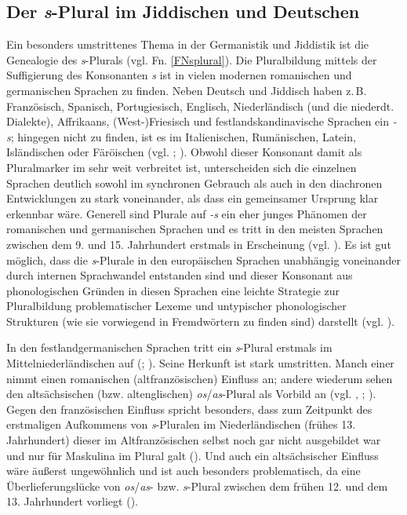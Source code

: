  \subsection{Der \textit{s}-Plural im Jiddischen und Deutschen}\label{sPlural}
 Ein besonders umstrittenes Thema in der Germanistik und Jiddistik ist die Genealogie des \textit{s}-Plurals (vgl. Fn. \ref{FNsplural}). Die Pluralbildung mittels der Suffigierung des Konsonanten \textit{s} ist in vielen modernen romanischen und germanischen Sprachen zu finden. Neben Deutsch und Jiddisch haben z.\,B. Französisch, Spanisch, Portugiesisch, Englisch, Niederländisch (und die niederdt. Dialekte), Affrikaans, (West-)Friesisch und  festlandskandinavische Sprachen ein  \textit{-s}; hingegen nicht zu finden, ist es im Italienischen, Rumänischen, Latein, Isländischen oder Färöischen (vgl. \cite{NueblingSchmuck2010}; \cite[88]{Hoekstra2001}). Obwohl dieser Konsonant damit als Pluralmarker im  sehr weit verbreitet ist, unterscheiden sich die einzelnen Sprachen deutlich sowohl im synchronen Gebrauch als auch in den diachronen Entwicklungen zu stark voneinander, als dass ein gemeinsamer Ursprung klar erkennbar wäre. Generell sind Plurale auf \textit{-s} ein eher junges Phänomen der romanischen und germanischen Sprachen und es tritt in den meisten Sprachen zwischen dem 9. und 15. Jahrhundert erstmals in Erscheinung (vgl. \cite{NueblingSchmuck2010}). Es ist gut möglich, dass die \textit{s}-Plurale in den europäischen Sprachen unabhängig voneinander durch internen Sprachwandel entstanden sind und dieser Konsonant aus phonologischen Gründen in diesen Sprachen eine leichte Strategie zur Pluralbildung problematischer Lexeme und untypischer phonologischer Strukturen (wie sie vorwiegend in Fremdwörtern zu finden sind) darstellt (vgl. \cite{Wiese2009}).
 
  
 In den festlandgermanischen Sprachen tritt ein \textit{s}-Plural erstmals im Mittelniederländischen auf (\cite{NueblingSchmuck2010}; \cite[422–425]{Schirmunski1962}). Seine Herkunft ist stark umstritten. Manch einer nimmt einen romanischen (altfranzösischen) Einfluss an; andere wiederum sehen den altsächsischen (bzw. altenglischen) \textit{os}/\textit{as}-Plural als Vorbild an (vgl. \cite{Philippa1981}, \citeyear{Philippa1982}; \cite{Oehmann1924}). Gegen den französischen Einfluss spricht besonders, dass zum Zeitpunkt des erstmaligen Aufkommens von \textit{s}-Pluralen im Niederländischen (frühes 13. Jahrhundert) dieser im Altfranzösischen selbst noch gar nicht ausgebildet war und nur für Maskulina im  Plural galt (\cite[150]{NueblingSchmuck2010}). Und auch ein altsächsischer Einfluss wäre äußerst ungewöhnlich und ist auch besonders problematisch, da eine Überlieferungslücke von \textit{os}/\textit{as}- bzw. \textit{s}-Plural zwischen dem frühen 12. und dem 13. Jahrhundert vorliegt (\cite[151]{NueblingSchmuck2010}).

